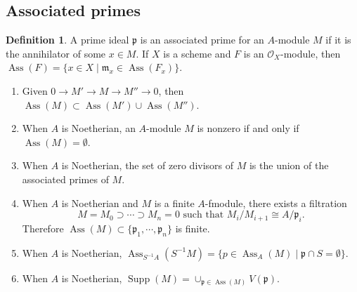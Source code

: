 \documentclass[leqno]{amsart}
\DeclareMathOperator{\Supp}{Supp}
\DeclareMathOperator{\Ass}{Ass}
\newcommand{\1}{\mathbf{1}}
\newcommand{\fm}{\mathfrak m}
\newcommand{\fp}{\mathfrak p}
\newcommand{\fq}{\mathfrak q}
\theoremstyle{definition}
\newtheorem{defn}[thm]{Definition}
\theoremstyle{remark}
\begin{document}
\subsection{Associated primes}
\begin{defn}
	A prime ideal $\fp$ is an associated prime
	for an $A$-module $M$ 
	if it is the annihilator of some  $x\in M$.
	If  $X$ is a scheme and $F$ is an $\mathcal{O}_X$-module,
	then  $\Ass(F)=\{x\in X\mid \fm_x\in \Ass(F_x)\}$.
\end{defn}
\begin{enumerate}[label=(\alph*)]
	\item 
	Given $0\to M'\to M\to M''\to 0$, then 
	$\Ass(M)\subset \Ass(M')\cup \Ass(M'')$.
	\item
	When $A$ is Noetherian, an $A$-module $M$ is nonzero
	if and only if $\Ass(M)=\emptyset$.
	\item
	When $A$ is Noetherian, the set of zero divisors of $M$ is 
	the union of the associated primes of $M$.
	\item
	When $A$ is Noetherian and  $M$ is a finite $A$-fmodule,
	there exists a filtration
	\[
		M=M_{0}\supset \cdots\supset M_{n}=0
		\text{ such that } M_i/M_{i+1}\cong A/\fp_i.
	\]
	Therefore $\Ass(M)\subset\{\fp_1,\cdots,\fp_n\}$ is finite.
	\item
	When $A$ is Noetherian,
	$\Ass_{S^{-1}A}(S^{-1}M)=
	\{p\in \Ass_A(M)\mid \fp\cap S=\emptyset\}$.
	\item
	When $A$ is Noetherian,
	$\Supp(M)=\cup_{\fp\in \Ass(M)}V(\fp)$.
\end{enumerate}
\end{document}
